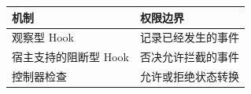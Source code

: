 \begin{tabular}{@{}P{4.0cm}P{8.5cm}@{}}
\toprule
\textbf{机制} & \textbf{权限边界} \\
\midrule
观察型 Hook & 记录已经发生的事件 \\
宿主支持的阻断型 Hook & 否决允许拦截的事件 \\
控制器检查 & 允许或拒绝状态转换 \\
\bottomrule
\end{tabular}
